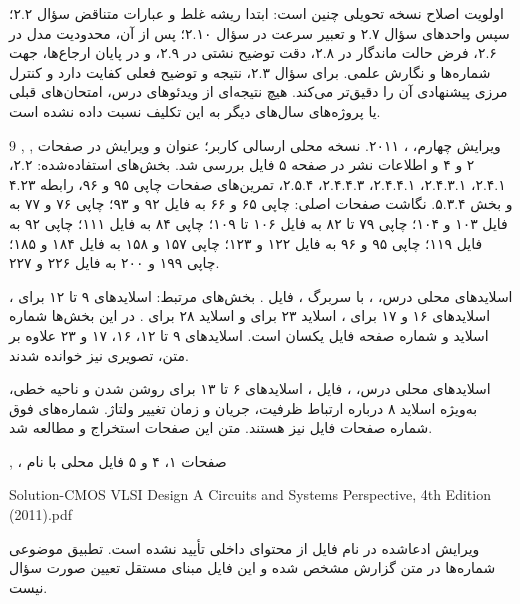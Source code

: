 \documentclass[12pt,a4paper]{article}
\newcommand{\exnum}[1]{\mbox{\beginL#1\endL}}
\newcommand{\reviewfile}[1]{\lr{\small\texttt{#1}}}
\begin{document}
اولویت اصلاح نسخه تحویلی چنین است: ابتدا ریشه غلط و عبارات متناقض سؤال \exnum{۲.۲}؛ سپس واحدهای سؤال \exnum{۲.۷} و تعبیر سرعت در سؤال \exnum{۲.۱۰}؛ پس از آن، محدودیت مدل در \exnum{۲.۶}، فرض حالت ماندگار در \exnum{۲.۸}، دقت توضیح نشتی در \exnum{۲.۹}، و در پایان ارجاع‌ها، جهت شماره‌ها و نگارش علمی. برای سؤال \exnum{۲.۳}، نتیجه و توضیح فعلی کفایت دارد و کنترل مرزی پیشنهادی آن را دقیق‌تر می‌کند. هیچ نتیجه‌ای از ویدئوهای درس، امتحان‌های قبلی یا پروژه‌های سال‌های دیگر به این تکلیف نسبت داده نشده است.

\clearpage
\begin{thebibliography}{9}
,
,
ویرایش چهارم، ، ۲۰۱۱.
نسخه محلی ارسالی کاربر؛ عنوان و ویرایش در صفحات ۲ و ۴ و اطلاعات نشر در صفحه ۵ فایل بررسی شد. بخش‌های استفاده‌شده: \exnum{۲.۲}، \exnum{۲.۴.۱}، \exnum{۲.۴.۳.۱}، \exnum{۲.۴.۴.۱}، \exnum{۲.۴.۴.۳}، \exnum{۲.۵.۴}، تمرین‌های صفحات چاپی ۹۵ و ۹۶، رابطه \exnum{۴.۲۳} و بخش \exnum{۵.۳.۴}. نگاشت صفحات اصلی: چاپی ۶۵ و ۶۶ به فایل ۹۲ و ۹۳؛ چاپی ۷۶ و ۷۷ به فایل ۱۰۳ و ۱۰۴؛ چاپی ۷۹ تا ۸۲ به فایل ۱۰۶ تا ۱۰۹؛ چاپی ۸۴ به فایل ۱۱۱؛ چاپی ۹۲ به فایل ۱۱۹؛ چاپی ۹۵ و ۹۶ به فایل ۱۲۲ و ۱۲۳؛ چاپی ۱۵۷ و ۱۵۸ به فایل ۱۸۴ و ۱۸۵؛ چاپی ۱۹۹ و ۲۰۰ به فایل ۲۲۶ و ۲۲۷.

اسلایدهای محلی درس، ، با سربرگ ، فایل \reviewfile{02-nonideal Sec2.4.pdf}. بخش‌های مرتبط: اسلایدهای ۹ تا ۱۲ برای ، اسلایدهای ۱۶ و ۱۷ برای ، اسلاید ۲۳ برای  و اسلاید ۲۸ برای . در این بخش‌ها شماره اسلاید و شماره صفحه فایل یکسان است. اسلایدهای ۹ تا ۱۲، ۱۶، ۱۷ و ۲۳ علاوه بر متن، تصویری نیز خوانده شدند.

اسلایدهای محلی درس، ، فایل \reviewfile{01-MOSFET Ch2.pdf}، اسلایدهای ۶ تا ۱۳ برای روشن شدن و ناحیه خطی، به‌ویژه اسلاید ۸ درباره ارتباط ظرفیت، جریان و زمان تغییر ولتاژ. شماره‌های فوق شماره صفحات فایل نیز هستند. متن این صفحات استخراج و مطالعه شد.

, ، صفحات ۱، ۴ و ۵ فایل محلی با نام
\begin{latin}\small
Solution-CMOS VLSI Design A Circuits and Systems Perspective, 4th Edition (2011).pdf
\end{latin}
ویرایش ادعاشده در نام فایل از محتوای داخلی تأیید نشده است. تطبیق موضوعی شماره‌ها در متن گزارش مشخص شده و این فایل مبنای مستقل تعیین صورت سؤال نیست.
\end{thebibliography}
\end{document}
